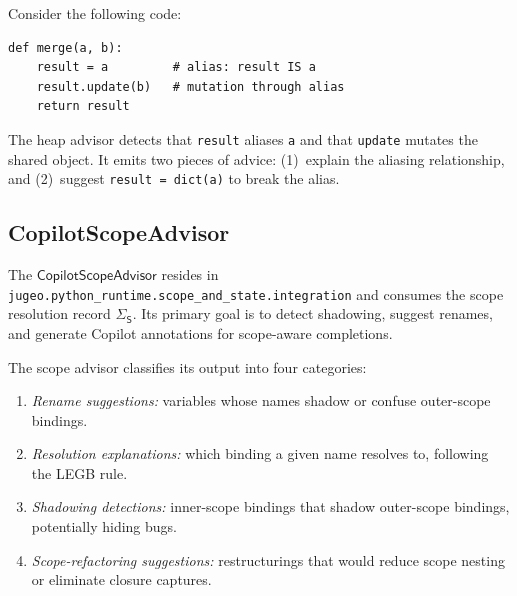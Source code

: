 \documentclass[11pt]{article}
\newcommand{\ScopeRes}{\Sigma_{\mathsf{S}}}
\begin{document}
\begin{example}\label{ex:heap}
Consider the following code:
\begin{lstlisting}[style=jugeo-python]
def merge(a, b):
    result = a         # alias: result IS a
    result.update(b)   # mutation through alias
    return result
\end{lstlisting}
The heap advisor detects that \texttt{result} aliases \texttt{a} and
that \texttt{update} mutates the shared object.  It emits two pieces
of advice: (1)~explain the aliasing relationship, and (2)~suggest
\texttt{result = dict(a)} to break the alias.
\end{example}

\subsection{CopilotScopeAdvisor}\label{sec:scope-advisor}

The $\mathsf{CopilotScopeAdvisor}$ resides in
\texttt{jugeo.python\_runtime.scope\_and\_state.integration} and
consumes the scope resolution record $\ScopeRes$.  Its primary goal
is to detect shadowing, suggest renames, and generate Copilot
annotations for scope-aware completions.

\begin{definition}\label{def:scope-cat}
The scope advisor classifies its output into four categories:
\begin{enumerate}
  \item \emph{Rename suggestions:} variables whose names shadow or
    confuse outer-scope bindings.
  \item \emph{Resolution explanations:} which binding a given name
    resolves to, following the LEGB rule.
  \item \emph{Shadowing detections:} inner-scope bindings that shadow
    outer-scope bindings, potentially hiding bugs.
  \item \emph{Scope-refactoring suggestions:} restructurings that
    would reduce scope nesting or eliminate closure captures.
\end{enumerate}
\end{definition}
\end{document}
